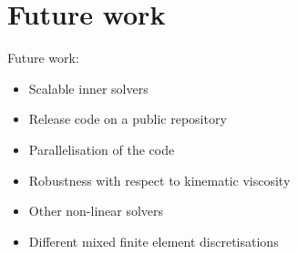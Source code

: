 \documentclass[handout]{beamer}
\newcommand{\re}[1]{{\textcolor{red}       {#1}}}
\begin{document}







\section{Future work}
\begin{frame}

Future work:
\begin{itemize}
\item Scalable inner solvers
\item Release code on a public repository
\item Parallelisation of the code
\item Robustness with respect to kinematic viscosity
\item Other non-linear solvers
\item Different mixed finite element discretisations
\end{itemize}
\end{frame}
\end{document}
